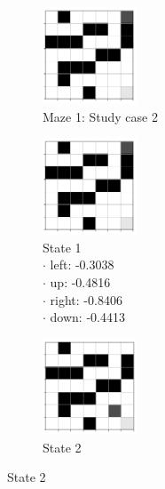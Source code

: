 \documentclass[a4paper]{article}    %
\begin{document}
\begin{figure}[H]
    \centering
    \begin{subfigure}{0.24\textwidth}
        \centering
        \includegraphics[width=2.8cm]{maze1-case2-state1}
        \caption{Maze 1: Study case 2 \vspace{12mm}}
        \label{fig:maze1-case2-states}
    \end{subfigure}
    \hfill
    \centering
    \begin{subfigure}{0.24\textwidth}
        \centering
        \includegraphics[width=2.8cm]{maze1-case2-state1}
        \captionsetup{singlelinecheck=off}
        \caption{State 1 \\
            \scriptsize
            \hspace*{5mm} $\boldsymbol{\cdot}$ left:  -0.3038 \\
            \hspace*{5mm} $\boldsymbol{\cdot}$ up:    -0.4816 \\
            \hspace*{5mm} $\boldsymbol{\cdot}$ right: -0.8406 \\
            \hspace*{5mm} $\boldsymbol{\cdot}$ down:  -0.4413 }
        \label{fig:maze1-case2-state1}
    \end{subfigure}
    \hfill
    \begin{subfigure}{0.24\textwidth}
        \centering
        \includegraphics[width=2.8cm]{maze1-case2-state2}
        \caption{State 2 \\
            \scriptsize
}
\end{subfigure}
\end{figure}
\end{document}
